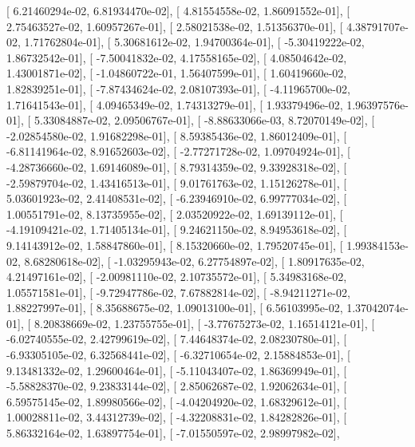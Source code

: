 \documentclass{article}
\begin{document}
       [  6.21460294e-02,   6.81934470e-02],
       [  4.81554558e-02,   1.86091552e-01],
       [  2.75463527e-02,   1.60957267e-01],
       [  2.58021538e-02,   1.51356370e-01],
       [  4.38791707e-02,   1.71762804e-01],
       [  5.30681612e-02,   1.94700364e-01],
       [ -5.30419222e-02,   1.86732542e-01],
       [ -7.50041832e-02,   4.17558165e-02],
       [  4.08504642e-02,   1.43001871e-02],
       [ -1.04860722e-01,   1.56407599e-01],
       [  1.60419660e-02,   1.82839251e-01],
       [ -7.87434624e-02,   2.08107393e-01],
       [ -4.11965700e-02,   1.71641543e-01],
       [  4.09465349e-02,   1.74313279e-01],
       [  1.93379496e-02,   1.96397576e-01],
       [  5.33084887e-02,   2.09506767e-01],
       [ -8.88633066e-03,   8.72070149e-02],
       [ -2.02854580e-02,   1.91682298e-01],
       [  8.59385436e-02,   1.86012409e-01],
       [ -6.81141964e-02,   8.91652603e-02],
       [ -2.77271728e-02,   1.09704924e-01],
       [ -4.28736660e-02,   1.69146089e-01],
       [  8.79314359e-02,   9.33928318e-02],
       [ -2.59879704e-02,   1.43416513e-01],
       [  9.01761763e-02,   1.15126278e-01],
       [  5.03601923e-02,   2.41408531e-02],
       [ -6.23946910e-02,   6.99777034e-02],
       [  1.00551791e-02,   8.13735955e-02],
       [  2.03520922e-02,   1.69139112e-01],
       [ -4.19109421e-02,   1.71405134e-01],
       [  9.24621150e-02,   8.94953618e-02],
       [  9.14143912e-02,   1.58847860e-01],
       [  8.15320660e-02,   1.79520745e-01],
       [  1.99384153e-02,   8.68280618e-02],
       [ -1.03295943e-02,   6.27754897e-02],
       [  1.80917635e-02,   4.21497161e-02],
       [ -2.00981110e-02,   2.10735572e-01],
       [  5.34983168e-02,   1.05571581e-01],
       [ -9.72947786e-02,   7.67882814e-02],
       [ -8.94211271e-02,   1.88227997e-01],
       [  8.35688675e-02,   1.09013100e-01],
       [  6.56103995e-02,   1.37042074e-01],
       [  8.20838669e-02,   1.23755755e-01],
       [ -3.77675273e-02,   1.16514121e-01],
       [ -6.02740555e-02,   2.42799619e-02],
       [  7.44648374e-02,   2.08230780e-01],
       [ -6.93305105e-02,   6.32568441e-02],
       [ -6.32710654e-02,   2.15884853e-01],
       [  9.13481332e-02,   1.29600464e-01],
       [ -5.11043407e-02,   1.86369949e-01],
       [ -5.58828370e-02,   9.23833144e-02],
       [  2.85062687e-02,   1.92062634e-01],
       [  6.59575145e-02,   1.89980566e-02],
       [ -4.04204920e-02,   1.68329612e-01],
       [  1.00028811e-02,   3.44312739e-02],
       [ -4.32208831e-02,   1.84282826e-01],
       [  5.86332164e-02,   1.63897754e-01],
       [ -7.01550597e-02,   2.98997982e-02],
\end{document}
